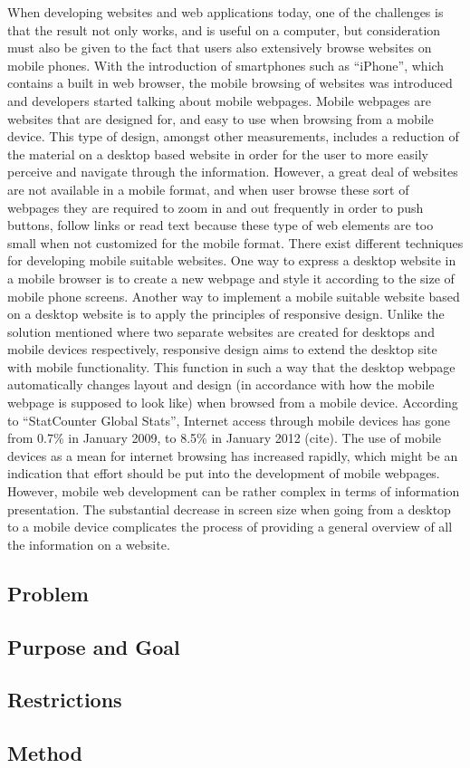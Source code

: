 When developing websites and web applications today, one of the challenges is that the result not only works, and is useful on a computer, but consideration must also be given to the fact that users also extensively browse websites on mobile phones. With the introduction of smartphones such as “iPhone”, which contains a built in web browser, the mobile browsing of websites was introduced and developers started talking about mobile webpages. Mobile webpages are websites that are designed for, and easy to use when browsing from a mobile device. This type of design, amongst other measurements, includes a reduction of the material on a desktop based website in order for the user to more easily perceive and navigate through the information. However, a great deal of websites are not available in a mobile format, and when user browse these sort of webpages they are required to zoom in and out frequently in order to push buttons, follow links or read text because these type of web elements are too small when not customized for the mobile format. 
There exist different techniques for developing mobile suitable websites. One way to express a desktop website in a mobile browser is to create a new webpage and style it according to the size of mobile phone screens. Another way to implement a mobile suitable website based on a desktop website is to apply the principles of responsive design. Unlike the solution mentioned where two separate websites are created for desktops and mobile devices respectively, responsive design aims to extend the desktop site with mobile functionality. This function in such a way that the desktop webpage automatically changes layout and design (in accordance with how the mobile webpage is supposed to look like) when browsed from a mobile device.
According to “StatCounter Global Stats”, Internet access through mobile devices has gone from 0.7\% in January 2009, to 8.5\% in January 2012 (cite). The use of mobile devices as a mean for internet browsing has increased rapidly, which might be an indication that effort should be put into the development of mobile webpages. However, mobile web development can be rather complex in terms of information presentation. The substantial decrease in screen size when going from a desktop to a mobile device complicates the process of providing a general overview of all the information on a website.



\subsection{Problem}

\subsection{Purpose and Goal}

\subsection{Restrictions}

\subsection{Method}
